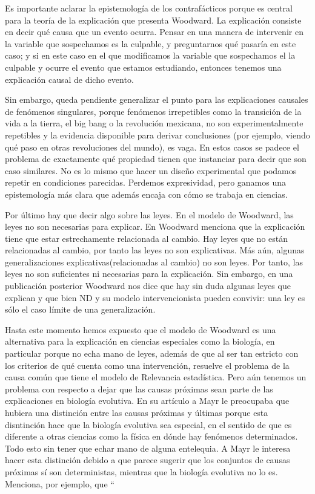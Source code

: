 Es importante aclarar la epistemología de los contrafácticos porque es central para la teoría de la explicación que presenta Woodward. La explicación consiste en decir qué causa que un evento ocurra. Pensar en una manera de intervenir en la variable que sospechamos es la culpable, y preguntarnos qué pasaría en este caso; y si en este caso en el que modificamos la variable que sospechamos el la culpable y ocurre el evento que estamos estudiando, entonces tenemos una explicación causal de dicho evento.

Sin embargo, queda pendiente generalizar el punto para las explicaciones causales de fenómenos singulares, porque fenómenos irrepetibles como la transición de la vida a la tierra, el big bang o la revolución mexicana, no son experimentalmente repetibles y la evidencia disponible para derivar conclusiones (por ejemplo, viendo qué paso en otras revoluciones del mundo), es vaga. En estos casos se padece el problema de exactamente qué propiedad tienen que instanciar para decir que son caso similares. No es lo mismo que hacer un diseño experimental que podamos repetir en condiciones parecidas. Perdemos expresividad, pero ganamos una epistemología más clara que además encaja con cómo se trabaja en ciencias.

Por último hay que decir algo sobre las leyes. En el modelo de Woodward, las leyes no son necesarias para explicar. En \cite{Woodward2000} Woodward menciona que la explicación tiene que estar estrechamente relacionada al cambio. Hay leyes que no están relacionadas al cambio, por tanto las leyes no son explicativas. Más aún, algunas generalizaciones explicativas(relacionadas al cambio) no son leyes. Por tanto, las leyes no son suficientes ni necesarias para la explicación. Sin embargo, en una publicación posterior \citeyear{Woodward2003} Woodward nos dice que hay sin duda algunas leyes que explican y que bien ND y su modelo intervencionista pueden convivir: una ley es sólo el caso límite de una generalización.

Hasta este momento hemos expuesto que el modelo de Woodward es una alternativa para la explicación en ciencias especiales como la biología, en particular porque no echa mano de leyes, además de que al ser tan estricto con los criterios de qué cuenta como una intervención, resuelve el problema de la causa común que tiene el modelo de Relevancia estadística. Pero aún tenemos un problema con respecto a dejar que las causas próximas sean parte de las explicaciones en biología evolutiva. En su artículo a Mayr \citeyear{Mayr1998} le preocupaba que hubiera una distinción entre las causas próximas y últimas porque esta disntinción hace que la biología evolutiva sea especial, en el sentido de que es diferente a otras ciencias como la física en dónde hay fenómenos determinados. Todo esto sin tener que echar mano de alguna entelequia. A Mayr le interesa hacer esta distinción debido a que parece sugerir que los conjuntos de causas próximas sí son deterministas, mientras que la biología evolutiva no lo es. Menciona, por ejemplo, que ``

